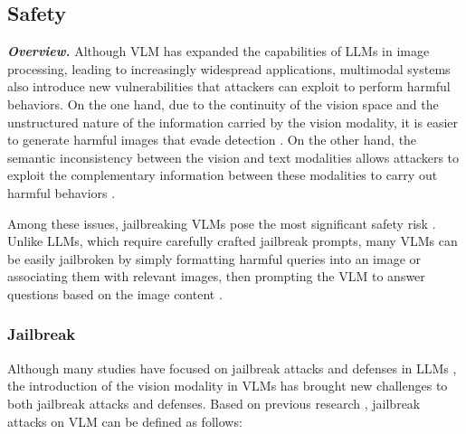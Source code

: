\clearpage
\subsection{Safety}

\textbf{\textit{Overview.}}
Although VLM has expanded the capabilities of LLMs in image processing, leading to increasingly widespread applications, multimodal systems also introduce new vulnerabilities that attackers can exploit to perform harmful behaviors\cite{wang2023instructta, guo2024moderating, schaeffer2024universal, ying2024jailbreak, ma2024visual, fan2024unbridled, luo2024jailbreakv, zong2024safety, niu2024jailbreaking, zhang2024jailguarduniversaldetectionframework, gu2024mllmguard, liu2024mmsafetybenchbenchmarksafetyevaluation, gong2023figstep, shayegani2023jailbreak, gu2024agent, dong2023robust, wu2023jailbreaking, li2024images, zhang2024benchmarkingtrustworthinessmultimodallarge, weng2024textit, liu2024survey, fan2024unbridled, sun2024safeguarding, gou2024eyes, hu2024vlsbench}. On the one hand, due to the continuity of the vision space and the unstructured nature of the information carried by the vision modality, it is easier to generate harmful images that evade detection \cite{madry2017towards, goodfellow2014explaining, bao2022towards, ilyas2019adversarial, zhouattack, bao2023towards, weng2024textit, qi2023visual}. On the other hand, the semantic inconsistency between the vision and text modalities allows attackers to exploit the complementary information between these modalities to carry out harmful behaviors \cite{shayegani2023jailbreak, gong2023figstep, liu2024mmsafetybenchbenchmarksafetyevaluation, luo2024jailbreakv, bailey2023image, hu2024vlsbench}.

Among these issues, jailbreaking VLMs pose the most significant safety risk \cite{bailey2023image, gong2023figstep, dong2023robust, niu2024jailbreaking}. 
Unlike LLMs, which require carefully crafted jailbreak prompts, many VLMs can be easily jailbroken by simply formatting harmful queries into an image or associating them with relevant images, then prompting the VLM to answer questions based on the image content \cite{gong2023figstep, liu2024mmsafetybenchbenchmarksafetyevaluation, shayegani2023jailbreak}.

\subsubsection{Jailbreak}
\label{sec:VLM_jailbreak}
Although many studies have focused on jailbreak attacks and defenses in LLMs \cite{wei2024jailbroken, zou2023universal, liu2023autodan, zhou2024defending}, the introduction of the vision modality in VLMs has brought new challenges to both jailbreak attacks and defenses. Based on previous research \cite{fan2024unbridled, shayegani2023jailbreak, weng2024textit}, jailbreak attacks on VLM can be defined as follows: 

